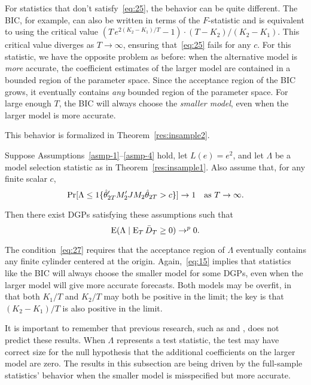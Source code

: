 For statistics that don't satisfy~\eqref{eq:25}, the behavior can be
quite different. The BIC, for example, can also be written in terms of
the $F$-statistic and is equivalent to using the critical value $(T \,
e^{2 (K_2 - K_1) / T} - 1) \cdot (T - K_2) / (K_2 - K_1)$. This
critical value diverges as $T \to \infty$, ensuring that~\eqref{eq:25}
fails for any $c$. For this statistic, we have the opposite problem as
before: when the alternative model is \emph{more} accurate, the
coefficient estimates of the larger model are contained in a bounded
region of the parameter space. Since the acceptance region of the BIC
grows, it eventually contains \emph{any} bounded region of the
parameter space. For large enough $T$, the BIC will always choose the
\emph{smaller model}, even when the larger model is more accurate.

This behavior is formalized in Theorem~\ref{res:insample2}.
\begin{thm}\label{res:insample2}
  Suppose Assumptions~\ref{asmp-1}--\ref{asmp-4} hold, let $L(e) =
  e^2$, and let $\Lambda$ be a model selection statistic as in
  Theorem~\ref{res:insample1}. Also assume that, for any finite scalar
  $c$,
  \begin{equation}\label{eq:27}
    \Pr[\Lambda \leq \operatorname{1}\{\hat\theta_{2T}'M_2'J M_2\hat\theta_{2T} > c \}] \to 1
    \quad \text{as } T \to \infty.
  \end{equation}

  Then there exist DGPs satisfying these assumptions such that
  \begin{equation}\label{eq:15}
    \operatorname{E}( \Lambda \mid \operatorname{E}_T \bar{D}_{T} \geq 0 ) \to^p 0.
  \end{equation}
\end{thm}

The condition~\eqref{eq:27} requires that the acceptance region of
$\Lambda$ eventually contains any finite cylinder centered at the
origin. Again,~\eqref{eq:15} implies that statistics like the BIC
will always choose the smaller model for some DGPs, even when the
larger model will give more accurate forecasts. Both models may be
overfit, in that both $K_1/T$ and $K_2/T$ may both be positive in the
limit; the key is that $(K_2 - K_1)/T$ is also positive in the limit.

It is important to remember that previous research, such as
\citet{Cal:11c} and \citet{Ana:12}, does not predict these
results. When $\Lambda$ represents a test statistic, the test may have
correct size for the null hypothesis that the additional coefficients
on the larger model are zero. The results in this subsection are being
driven by the full-sample statistics' behavior when the smaller model
is misspecified but more accurate.

